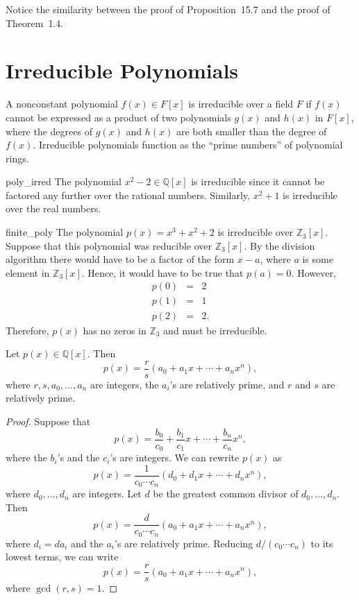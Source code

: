  
\medskip
 
 
Notice the similarity between the proof of Proposition~15.7 and the 
proof of Theorem~1.4.
 
 
 
\section{Irreducible Polynomials}
 
 
A nonconstant polynomial $f(x) \in F[x]$ is {\bfi
irreducible\/}
over a field $F$ if $f(x)$ cannot be expressed as a product of two
polynomials $g(x)$ and $h(x)$ in $F[x]$, where the degrees of $g(x)$
and $h(x)$ are both smaller than the degree of $f(x)$.  Irreducible
polynomials function as the ``prime numbers'' of polynomial rings.
 
 
\begin{example}{poly_irred}
The polynomial $x^2 - 2 \in {\mathbb Q}[x]$ is irreducible since it
cannot be factored any further over the rational numbers. Similarly,
$x^2 + 1$ is  irreducible over the real numbers. 
\end{example}
 
 
\begin{example}{finite_poly}
The polynomial $p(x) = x^3 + x^2 + 2$ is irreducible over ${\mathbb
Z}_3[x]$. Suppose that this polynomial was reducible over ${\mathbb
Z}_3[x]$.  By the division algorithm there would have to be a factor
of the form $x - a$, where $a$ is some element in ${\mathbb Z}_3[x]$.
Hence, it would have to be true that $p(a) = 0$.  However,
\begin{eqnarray*}
p(0) & = & 2 \\
p(1) & = & 1 \\
p(2) & = & 2.
\end{eqnarray*}
Therefore, $p(x)$ has no zeros in ${\mathbb Z}_3$ and must be
irreducible. 
\end{example}
 
 
\begin{lemma}
Let $p(x) \in {\mathbb Q}[x]$.  Then
$$
p(x) = \frac{r}{s}(a_0 + a_1 x + \cdots + a_n x^n),
$$
where $r, s, a_0, \ldots, a_n$ are integers, the $a_i$'s are
relatively prime, and $r$ and $s$ are relatively prime. 
\end{lemma}
 
 
\begin{proof}
Suppose that
$$
p(x) = \frac{b_0}{c_0} + \frac{b_1}{c_1} x + \cdots + \frac{b_n}{c_n}
x^n,
$$
where the $b_i$'s and the $c_i$'s are integers. We can rewrite $p(x)$
as 
$$
p(x) = \frac{1}{c_0 \cdots c_n} (d_0 + d_1 x + \cdots + d_n x^n),
$$
where $d_0, \ldots, d_n$ are integers. Let $d$ be the greatest common
divisor of $d_0, \ldots, d_n$.  Then
$$
p(x) = \frac{d}{c_0 \cdots c_n} (a_0 + a_1 x + \cdots + a_n x^n),
$$
where $d_i = d a_i$ and the $a_i$'s are relatively prime. Reducing $d
/(c_0 \cdots c_n)$ to its lowest terms, we can write
$$
p(x) = \frac{r}{s}(a_0 + a_1 x + \cdots + a_n x^n), 
$$
where $\gcd(r,s) = 1$.
\end{proof}
 
